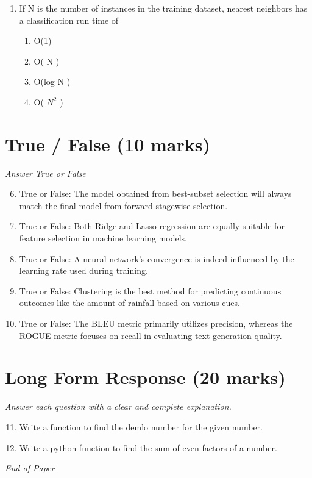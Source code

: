 \documentclass[12pt]{article}
\begin{document}
\begin{enumerate}[label=\arabic*.]
\begin{enumerate}[label=(\alph*)]
    \item L 2 norm
    \item either (a) or (b)
\end{enumerate}
\item If N is the number of instances in the training dataset, nearest neighbors has a classification run time of
\begin{enumerate}[label=(\alph*)]
    \item O(1)
    \item O( N )
    \item O(log N )
    \item O( $N^2$ )
\end{enumerate}
\end{enumerate}

\section*{True / False (10 marks)}
\textit{Answer True or False}
\begin{enumerate}[label=\arabic*.]
\setcounter{enumi}{5}
\item True or False: The model obtained from best-subset selection will always match the final model from forward stagewise selection.
\item True or False: Both Ridge and Lasso regression are equally suitable for feature selection in machine learning models.
\item True or False: A neural network's convergence is indeed influenced by the learning rate used during training.
\item True or False: Clustering is the best method for predicting continuous outcomes like the amount of rainfall based on various cues.
\item True or False: The BLEU metric primarily utilizes precision, whereas the ROGUE metric focuses on recall in evaluating text generation quality.
\end{enumerate}

\section*{Long Form Response (20 marks)}
\textit{Answer each question with a clear and complete explanation.}
\begin{enumerate}[label=\arabic*.]
\setcounter{enumi}{10}
\item Write a function to find the demlo number for the given number.
\item Write a python function to find the sum of even factors of a number.
\end{enumerate}

\vfill
\noindent\textit{End of Paper}
\end{document}
